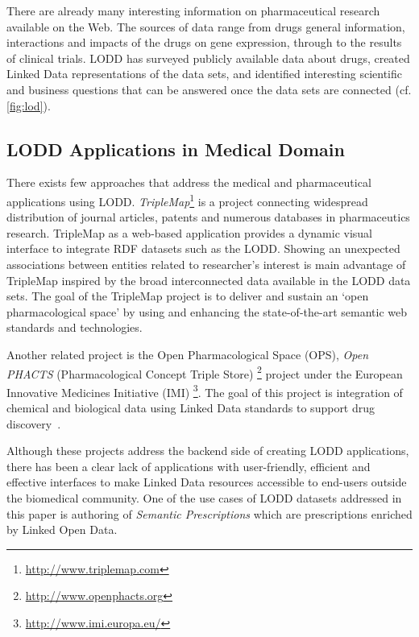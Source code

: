 \documentclass[conference]{IEEEtran}
\begin{document}
There are already many interesting information on pharmaceutical research available on the Web.
The sources of data range from drugs general information, interactions and impacts of the drugs on gene expression, through to the results of clinical trials.
LODD\cite{lodrug} has surveyed publicly available data about drugs, created Linked Data representations of the data sets, and identified interesting scientific and business questions that can be answered once the data sets are connected (cf. \autoref{fig:lod}).

\subsection{LODD Applications in Medical Domain}

There exists few approaches that address the medical and pharmaceutical applications using LODD.
\emph{TripleMap}\footnote{\url{http://www.triplemap.com}} is a project connecting widespread distribution of journal articles, patents and numerous databases in pharmaceutics research.
TripleMap as a web-based application provides a dynamic visual interface to integrate RDF datasets such as the LODD.
Showing an unexpected associations between entities related to researcher's interest is main advantage of TripleMap inspired  by the broad interconnected data available in the LODD data sets.
The goal of the TripleMap project is to deliver and sustain an ‘open pharmacological space’ by using and enhancing the state-of-the-art semantic web standards and technologies\cite{TripleMap}.

 Another related project is the Open Pharmacological Space (OPS), \emph{Open PHACTS} (Pharmacological Concept Triple Store) \footnote{\url{http://www.openphacts.org}} project under the European Innovative Medicines Initiative (IMI) \footnote{\url{http://www.imi.europa.eu/}}.
 The goal of this project is integration of chemical and biological data using Linked Data standards to support drug discovery~\cite{Openphacts}.

Although these projects address the backend side of creating LODD applications, there has been a clear lack of applications with user-friendly, efficient and effective interfaces to make Linked Data resources accessible to end-users outside the biomedical community.
One of the use cases of LODD datasets addressed in this paper is authoring of \emph{Semantic Prescriptions} which are prescriptions enriched by Linked Open Data.
\end{document}
